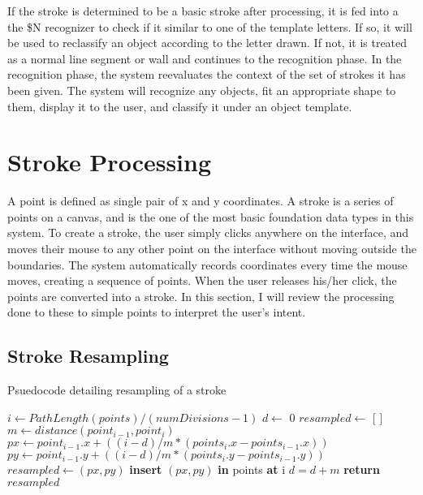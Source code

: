 If the stroke is determined to be a basic stroke after processing, it is fed into a the \$N recognizer to check if it similar to one of the template letters. If so, it will be used to reclassify an object according to the letter drawn. If not, it is treated as a normal line segment or wall and continues to the recognition phase. In the recognition phase, the system reevaluates the context of the set of strokes it has been given. The system will recognize any objects, fit an appropriate shape to them, display it to the user, and classify it under an object template.

\section{Stroke Processing}
\label{sec:strokeproc}

A point is defined as single pair of x and y coordinates. A stroke is a series of points on a canvas, and is the one of the most basic foundation data types in this system. To create a stroke, the user simply clicks anywhere on the interface, and moves their mouse to any other point on the interface without moving outside the boundaries. The system automatically records coordinates every time the mouse moves, creating a sequence of points. When the user releases his/her click, the points are converted into a stroke. In this section, I will review the processing done to these to simple points to interpret the user's intent.

\subsection{Stroke Resampling}
\label{sec:resample}

\begin{algorithm}
\caption[Pseudocode for resampling]{Psuedocode detailing resampling of a stroke}
\label{alg:resampling}
\begin{algorithmic}[1]
\State $i \gets  PathLength(points) / (numDivisions -1)$
\State $d \gets $ 0
\State $resampled \gets $ [ ]
    \State $m \gets  distance(point_{i-1}, point_i)$
        \State $px \gets point_{i-1}.x + ((i-d)/m * (points_i.x - points_{i-1}.x))$ 
        \State $py \gets point_{i-1}.y + ((i-d)/m * (points_i.y - points_{i-1}.y))$ 
        \State $resampled \gets (px, py)$
        \State \textbf{insert} $(px,py)$ \textbf{in} points \textbf{at} i
    \Else
        \State $d = d+m$
    \EndIf
\EndFor
\State \textbf{return} $resampled$
\EndFunction
\end{algorithmic}
\end{algorithm}

